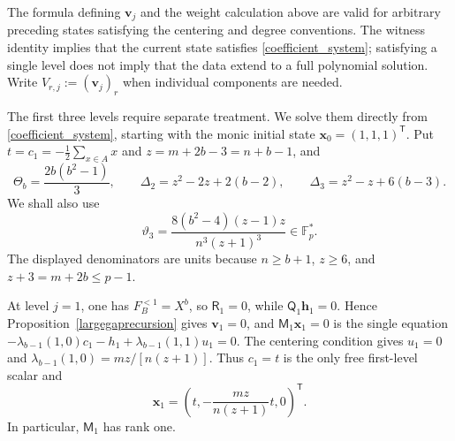 \documentclass[12pt]{article}
\theoremstyle{remark}
\newcommand{\F}{\mathbb{F}_p}
\begin{document}
The formula defining $\mathbf v_j$ and the weight calculation above
are valid for arbitrary preceding states satisfying the centering and
degree conventions.  The witness identity implies that the current state satisfies
\eqref{coefficient_system}; satisfying a single level does not imply
that the data extend to a full polynomial solution.
Write $V_{r,j}:=(\mathbf v_j)_r$ when individual components are needed.

The first three levels require separate treatment.  We solve them
directly from
\eqref{coefficient_system}, starting with the monic initial state
$\mathbf x_0=(1,1,1)^{\mathsf T}$.  Put
$t=c_1=-\frac12\sum_{x\in A}x$ and $z=m+2b-3=n+b-1$, and
\begin{equation*}
 \Theta_b=\frac{2b(b^2-1)}3,\qquad
 \Delta_2=z^2-2z+2(b-2),\qquad
 \Delta_3=z^2-z+6(b-3).
\end{equation*}
We shall also use
\begin{equation}\label{vartheta3def}
 \vartheta_3=\frac{8(b^2-4)(z-1)z}{n^3(z+1)^3}\in\F^*.
\end{equation}
The displayed denominators are units because $n\ge b+1$, $z\ge6$,
and $z+3=m+2b\le p-1$.

At level $j=1$, one has $F_B^{<1}=X^b$, so $\mathsf R_1=0$,
while $\mathsf Q_1\mathbf h_1=0$.  Hence Proposition~\ref{largegaprecursion}
gives $\mathbf v_1=0$, and $\mathsf M_1\mathbf x_1=0$ is the single equation
$-\lambda_{b-1}(1,0)c_1-h_1+\lambda_{b-1}(1,1)u_1=0$.
The centering condition gives $u_1=0$ and
$\lambda_{b-1}(1,0)=mz/[n(z+1)]$.  Thus $c_1=t$ is the only free first-level scalar and
\begin{equation}\label{h1formula}
 \mathbf x_1=
 \left(t,-\frac{mz}{n(z+1)}t,0\right)^{\mathsf T}.
\end{equation}
In particular, $\mathsf M_1$ has rank one.
\end{document}
